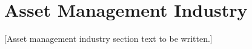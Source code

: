 
\section{Asset Management Industry}
\label{sec:asset_mgmt}


[Asset management industry section text to be written.]
